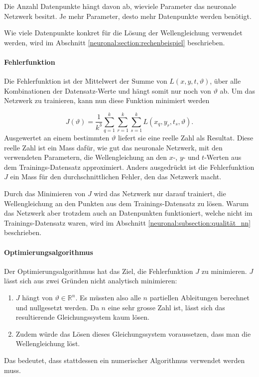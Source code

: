 Die Anzahl Datenpunkte hängt davon ab, wieviele Parameter das neuronale Netzwerk besitzt.
Je mehr Parameter, desto mehr Datenpunkte werden benötigt.

Wie viele Datenpunkte konkret für die Lösung der Wellengleichung verwendet werden, wird im Abschnitt \ref{neuronal:section:rechenbeispiel} beschrieben.

\paragraph{Fehlerfunktion}

Die Fehlerfunktion ist der Mittelwert der Summe von \( L(x, y, t, \vartheta) \), über alle Kombinationen der Datensatz-Werte und hängt somit nur noch von \( \vartheta \) ab.
Um das Netzwerk zu trainieren, kann nun diese Funktion minimiert werden

\begin{equation}
    J(\vartheta) = \frac{1}{k^3} \sum_{q=1}^{k} \sum_{r=1}^{k} \sum_{s=1}^{k} L(x_q, y_r, t_s, \vartheta).
    \label{neuronal:loss}
\end{equation}
Ausgewertet an einem bestimmten \( \vartheta \) liefert sie eine reelle Zahl als Resultat.
Diese reelle Zahl ist ein Mass dafür, wie gut das neuronale Netzwerk, mit den verwendeten Parametern, die Wellengleichung an den \( x \)-, \( y \)- und \( t \)-Werten aus dem Trainings-Datensatz approximiert.
Anders ausgedrückt ist die Fehlerfunktion \( J \) ein Mass für den durchschnittlichen Fehler, den das Netzwerk macht.

Durch das Minimieren von \( J \) wird das Netzwerk nur darauf trainiert, die Wellengleichung an den Punkten aus dem Trainings-Datensatz zu lösen.
Warum das Netzwerk aber trotzdem auch an Datenpunkten funktioniert, welche nicht im Trainings-Datensatz waren, wird im Abschnitt \ref{neuronal:subsection:qualität_nn} beschrieben.

\paragraph{Optimierungsalgorithmus}

Der Optimierungsalgorithmus hat das Ziel, die Fehlerfunktion \( J \) zu minimieren.
\( J \) lässt sich aus zwei Gründen nicht analytisch minimieren:
\begin{enumerate}
    \item \( J \) hängt von \( \vartheta \in \mathbb{R}^n \). 
    Es müssten also alle \( n \) partiellen Ableitungen berechnet und nullgesetzt werden. 
    Da \( n \) eine sehr grosse Zahl ist, lässt sich das resultierende Gleichungssystem kaum lösen.
    \item Zudem würde das Lösen dieses Gleichungssystem voraussetzen, dass man die Wellengleichung löst.
\end{enumerate}
Das bedeutet, dass stattdessen ein numerischer Algorithmus verwendet werden muss.


